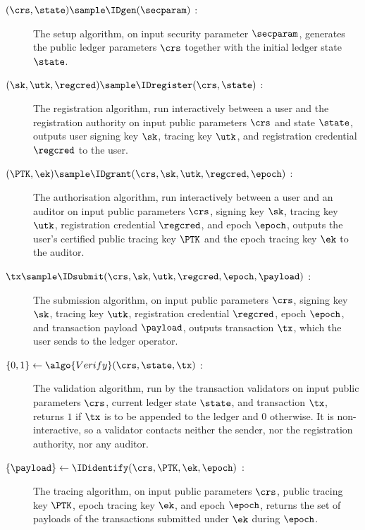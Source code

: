 \begin{description}

  \item[$(\crs,\state) \sample \IDgen(\secparam)$ :] The setup algorithm, on
input security parameter $\secparam$, generates the public ledger parameters
$\crs$ together with the initial ledger state $\state$.

  \item[$(\sk,\utk,\regcred) \sample \IDregister(\crs,\state)$ :] The
registration algorithm, run interactively between a user and the registration
authority on input public parameters $\crs$ and state $\state$, outputs user
signing key $\sk$, tracing key $\utk$, and registration credential $\regcred$ to
the user.

  \item[$(\PTK,\ek) \sample \IDgrant(\crs,\sk,\utk,\regcred,\epoch)$ :] The
authorisation algorithm, run interactively between a user and an auditor on
input public parameters $\crs$, signing key $\sk$, tracing key $\utk$,
registration credential $\regcred$, and epoch $\epoch$, outputs the user's
certified public tracing key
$\PTK$ and the epoch tracing key $\ek$ to the auditor.

  \item[$\tx \sample \IDsubmit(\crs,\sk,\utk,\regcred,\epoch,\payload)$ :] The
submission algorithm, on input public parameters $\crs$, signing key $\sk$,
tracing key $\utk$, registration credential $\regcred$, epoch $\epoch$, and
transaction payload $\payload$, outputs transaction $\tx$, which the user sends
to the ledger
operator.

  \item[$\{0,1\} \leftarrow \algo{Verify}(\crs,\state,\tx)$ :] The validation
algorithm, run by the transaction validators on input public parameters $\crs$,
current ledger state $\state$, and transaction $\tx$, returns $1$ if $\tx$ is to
be appended to the ledger and $0$ otherwise. It is non-interactive, so a validator
contacts neither the sender, nor the registration authority, nor any auditor.

  \item[$\{\payload\} \leftarrow \IDidentify(\crs,\PTK,\ek,\epoch)$ :] The
tracing algorithm, on input public parameters $\crs$, public tracing key $\PTK$,
epoch tracing key $\ek$, and epoch $\epoch$, returns the set of payloads of the
transactions submitted under $\ek$ during $\epoch$.

\end{description}

